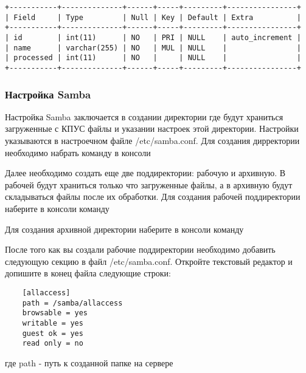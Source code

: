 ﻿\documentclass[12pt]{article}[a4paper,14pt,russian]
\begin{document}
\begin{enumerate}
	\begin{verbatim}
+-----------+--------------+------+-----+---------+----------------+
| Field     | Type         | Null | Key | Default | Extra          |
+-----------+--------------+------+-----+---------+----------------+
| id        | int(11)      | NO   | PRI | NULL    | auto_increment |
| name      | varchar(255) | NO   | MUL | NULL    |                |
| processed | int(11)      | NO   |     | NULL    |                |
+-----------+--------------+------+-----+---------+----------------+

\end{verbatim}

	\end{enumerate} 


	
	\subsubsection { Настройка Samba}
	
	Настройка Samba заключается в создании директории где будут храниться загруженные с КПУС файлы и указании настроек этой директории. Настройки указываются в настроечном файле /etc/samba.conf.
	Для создания дирректории  необходимо набрать команду в консоли
	\begin{center}
	\end{center}
	Далее необходимо создать еще две поддиректории: рабочую и архивную. В рабочей будут храниться только что загруженные файлы, а в архивную будут складываться файлы после их обработки. 
	Для создания рабочей поддиректории наберите в консоли команду
	\begin{center}
	\end{center}
	Для создания архивной директории наберите в консоли команду
	\begin{center}
	\end{center}
	После того как вы создали рабочие поддиректории необходимо  добавить следующую секцию в файл /etc/samba.conf. Откройте текстовый редактор и допишите в конец файла следующие строки:
	\begin {verbatim}
	[allaccess]
	path = /samba/allaccess
	browsable = yes
	writable = yes
	guest ok = yes
	read only = no
\end{verbatim}
где path - путь к созданной папке на сервере
\end{document}
